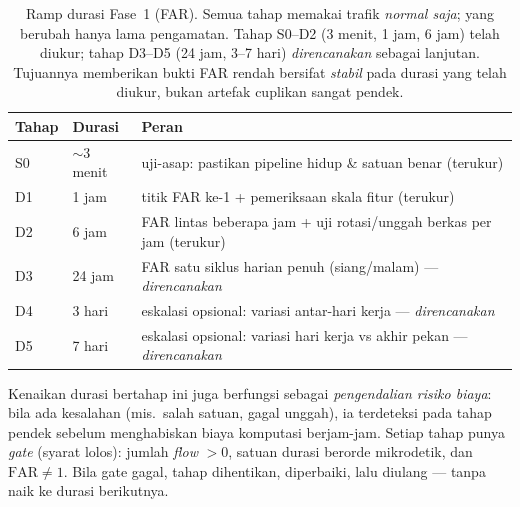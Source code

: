 \documentclass[11pt,a4paper]{article}
\begin{document}
\begin{table}[h]
\centering
\caption{Ramp durasi Fase~1 (FAR). Semua tahap memakai trafik \emph{normal saja};
yang berubah hanya lama pengamatan. Tahap S0--D2 (3 menit, 1 jam, 6 jam) telah
diukur; tahap D3--D5 (24 jam, 3--7 hari) \emph{direncanakan} sebagai lanjutan.
Tujuannya memberikan bukti FAR rendah bersifat \emph{stabil} pada durasi yang telah
diukur, bukan artefak cuplikan sangat pendek.}
\label{tab:ramp}
\small
\begin{tabular}{llp{7.2cm}}
\toprule
Tahap & Durasi & Peran \\
\midrule
S0 & $\sim$3 menit & uji-asap: pastikan pipeline hidup \& satuan benar (terukur) \\
D1 & 1 jam  & titik FAR ke-1 + pemeriksaan skala fitur (terukur) \\
D2 & 6 jam  & FAR lintas beberapa jam + uji rotasi/unggah berkas per jam (terukur) \\
D3 & 24 jam & FAR satu siklus harian penuh (siang/malam) --- \emph{direncanakan} \\
D4 & 3 hari & eskalasi opsional: variasi antar-hari kerja --- \emph{direncanakan} \\
D5 & 7 hari & eskalasi opsional: variasi hari kerja vs akhir pekan --- \emph{direncanakan} \\
\bottomrule
\end{tabular}
\end{table}

Kenaikan durasi bertahap ini juga berfungsi sebagai \emph{pengendalian risiko
biaya}: bila ada kesalahan (mis.\ salah satuan, gagal unggah), ia terdeteksi pada
tahap pendek sebelum menghabiskan biaya komputasi berjam-jam. Setiap tahap punya
\emph{gate} (syarat lolos): jumlah \emph{flow} $>0$, satuan durasi berorde
mikrodetik, dan $\mathrm{FAR}\neq 1$. Bila gate gagal, tahap dihentikan,
diperbaiki, lalu diulang --- tanpa naik ke durasi berikutnya.
\end{document}
